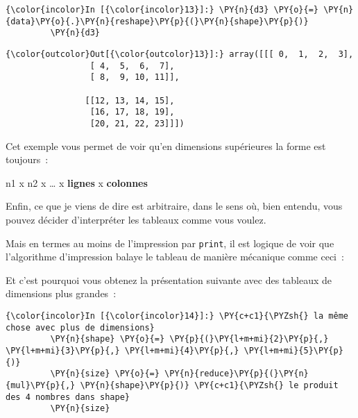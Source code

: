     \begin{Verbatim}[commandchars=\\\{\},frame=single,framerule=0.3mm,rulecolor=\color{cellframecolor}]
{\color{incolor}In [{\color{incolor}13}]:} \PY{n}{d3} \PY{o}{=} \PY{n}{data}\PY{o}{.}\PY{n}{reshape}\PY{p}{(}\PY{n}{shape}\PY{p}{)}
         \PY{n}{d3}
\end{Verbatim}


\begin{Verbatim}[commandchars=\\\{\},frame=single,framerule=0.3mm,rulecolor=\color{cellframecolor}]
{\color{outcolor}Out[{\color{outcolor}13}]:} array([[[ 0,  1,  2,  3],
                 [ 4,  5,  6,  7],
                 [ 8,  9, 10, 11]],
         
                [[12, 13, 14, 15],
                 [16, 17, 18, 19],
                 [20, 21, 22, 23]]])
\end{Verbatim}
            
    Cet exemple vous permet de voir qu'en dimensions supérieures la forme
est toujours~:

n1 x n2 x \ldots{} x \textbf{lignes} x \textbf{colonnes}

    Enfin, ce que je viens de dire est arbitraire, dans le sens où, bien
entendu, vous pouvez décider d'interpréter les tableaux comme vous
voulez.

Mais en termes au moins de l'impression par \texttt{print}, il est
logique de voir que l'algorithme d'impression balaye le tableau de
manière mécanique comme ceci~:

\begin{Shaded}
\begin{Highlighting}[frame=lines,framerule=0.6mm,rulecolor=\color{asisframecolor}]
 \NormalTok{(}\NormalTok{):}
     \NormalTok{(}\NormalTok{):}
         \NormalTok{(}\NormalTok{):}
\end{Highlighting}
\end{Shaded}

    Et c'est pourquoi vous obtenez la présentation suivante avec des
tableaux de dimensions plus grandes~:

    \begin{Verbatim}[commandchars=\\\{\},frame=single,framerule=0.3mm,rulecolor=\color{cellframecolor}]
{\color{incolor}In [{\color{incolor}14}]:} \PY{c+c1}{\PYZsh{} la même chose avec plus de dimensions}
         \PY{n}{shape} \PY{o}{=} \PY{p}{(}\PY{l+m+mi}{2}\PY{p}{,} \PY{l+m+mi}{3}\PY{p}{,} \PY{l+m+mi}{4}\PY{p}{,} \PY{l+m+mi}{5}\PY{p}{)}
         \PY{n}{size} \PY{o}{=} \PY{n}{reduce}\PY{p}{(}\PY{n}{mul}\PY{p}{,} \PY{n}{shape}\PY{p}{)} \PY{c+c1}{\PYZsh{} le produit des 4 nombres dans shape}
         \PY{n}{size}
\end{Verbatim}


